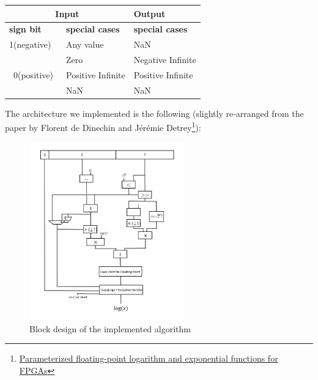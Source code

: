 \documentclass{report}
\begin{document}
\begin{table}[ht]
\centering
\begin{tabular}{|l|l|l|} 
\hline
\multicolumn{2}{|c|}{\textbf{Input}}                                          & \textbf{Output}         \\ 
\hline
\textbf{sign bit}               & \multicolumn{1}{|l|}{\textbf{special cases}} & \textbf{special cases}  \\ 
\hline
1(negative)                     & Any value                                   & NaN                     \\ 
\cline{1-3}
\multirow{4}{*}{~0(positive)~} & Zero                                        & Negative Infinite       \\
\cline{2-3}                                & Positive Infinite                           & Positive Infinite       \\
\cline{2-3}                                & NaN                                         & NaN                     \\
\hline
\end{tabular}
\end{table}
\newpage
The architecture we implemented is the following (slightly re-arranged from the paper by Florent de Dinechin and J\'{e}r\'{e}mie Detrey\footnote{\href{https://hal-ens-lyon.archives-ouvertes.fr/ensl-00542213/file/DetreyDinechinJMM.pdf} {Parameterized floating-point logarithm and exponential functions for FPGAs} }):
\begin{figure}[h]
  \centering
    \includegraphics[width=0.6\textwidth]{images/block_diagram.jpg}
    \caption{Block design of the implemented algorithm}
\end{figure}
\end{document}
